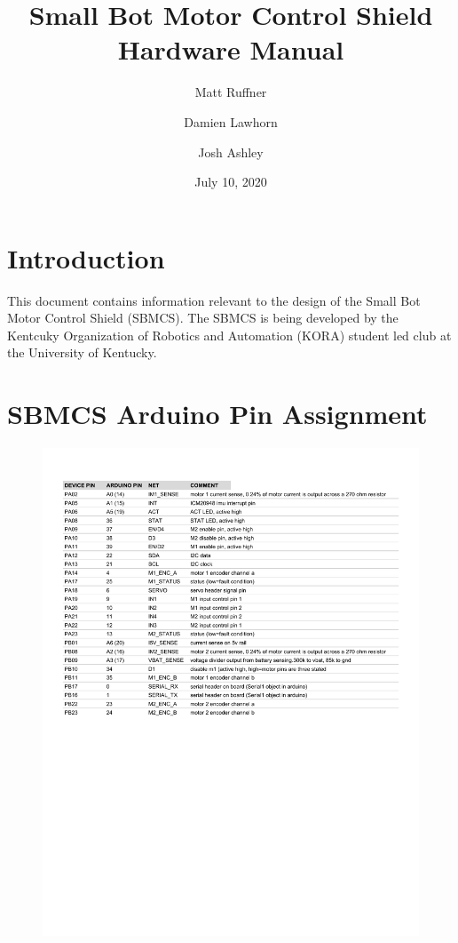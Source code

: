 \documentclass{article}
\title{Small Bot Motor Control Shield Hardware Manual}
\author[1]{Matt Ruffner}
\author[1]{Damien Lawhorn}
\author[1]{Josh Ashley}
\affil[1]{University of Kentucky}
\date{July 10, 2020}
\begin{document}
\maketitle
\tableofcontents
\listoffigures
\listoftables

\section{Introduction}
This document contains information relevant to the design of the Small Bot Motor Control Shield (SBMCS). The SBMCS is being developed by the Kentcuky Organization of Robotics and Automation (KORA) student led club at the University of Kentucky.

\appendix
\label{sec:appa}

\section{SBMCS Arduino Pin Assignment}
\begin{figure}[H]
    \centering
    \includegraphics[width=\textwidth]{sbmcs-arduino-pinmap.pdf}
    \label{fig:sbmcs-arduino-pinmap}
\end{figure}
\end{document}
